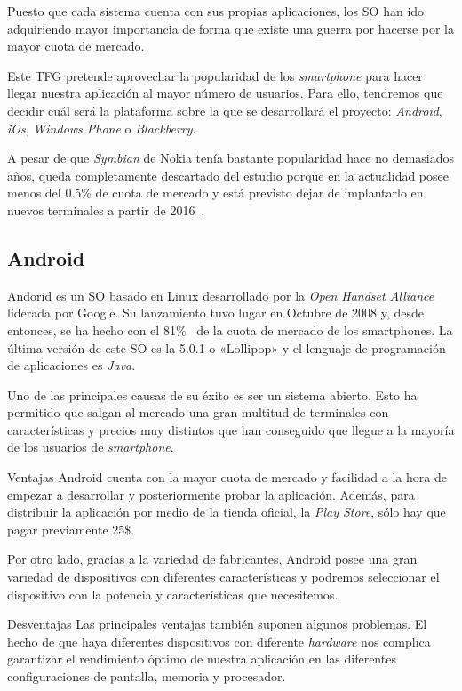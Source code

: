 Puesto que cada sistema cuenta con sus propias aplicaciones, los \acs{SO} han ido adquiriendo mayor
importancia de forma que existe una guerra por hacerse por la mayor cuota de mercado.

Este \acs{TFG} pretende aprovechar la popularidad de los \emph{smartphone} para hacer llegar nuestra
aplicación al mayor número de usuarios. Para ello, tendremos que decidir cuál será la plataforma
sobre la que se desarrollará el proyecto: \emph{Android}, \emph{iOs}, \emph{Windows Phone} o
\emph{Blackberry}.

A pesar de que \emph{Symbian} de Nokia tenía bastante popularidad hace no demasiados años, queda
completamente descartado del estudio porque en la actualidad posee menos del 0.5\% de cuota de
mercado y está previsto dejar de implantarlo en nuevos terminales a partir de
2016~\cite{Litchfield13}.

\subsection{Android}

Andorid es un \acs{SO} basado en Linux desarrollado por la \emph{Open Handset Alliance} liderada por
Google. Su lanzamiento tuvo lugar en Octubre de 2008 y, desde entonces, se ha hecho con el
81\%~\cite{Llamas13} de la cuota de mercado de los smartphones. La última versión de este \acs{SO}
es la 5.0.1 o «Lollipop» y el lenguaje de programación de aplicaciones es \emph{Java}.

Uno de las principales causas de su éxito es ser un sistema abierto. Esto ha permitido que salgan al
mercado una gran multitud de terminales con características y precios muy distintos que han
conseguido que llegue a la mayoría de los usuarios de \emph{smartphone}.

\begin{definitionlist}
  \item[Ventajas] Android cuenta con la mayor cuota de mercado y facilidad a la hora de empezar a
    desarrollar y posteriormente probar la aplicación. Además, para distribuir la aplicación por
    medio de la tienda oficial, la \emph{Play Store}, sólo hay que pagar previamente 25\$.

    Por otro lado, gracias a la variedad de fabricantes, Android posee una gran variedad de
    dispositivos con diferentes características y podremos seleccionar el dispositivo con la
    potencia y características que necesitemos.

  \item[Desventajas] Las principales ventajas también suponen algunos problemas. El hecho de que
    haya diferentes dispositivos con diferente \emph{hardware} nos complica garantizar el
    rendimiento óptimo de nuestra aplicación en las diferentes configuraciones de pantalla, memoria
    y procesador.

\end{definitionlist}

